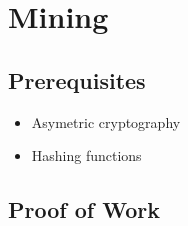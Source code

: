\documentclass{beamer}
\begin{document}
\section{Mining}
\subsection{Prerequisites}

\begin{frame}
    \begin{itemize}
        \item Asymetric cryptography
        \item Hashing functions
    \end{itemize}
\end{frame}

\subsection{Proof of Work}

\begin{frame}
\end{frame}
\end{document}
